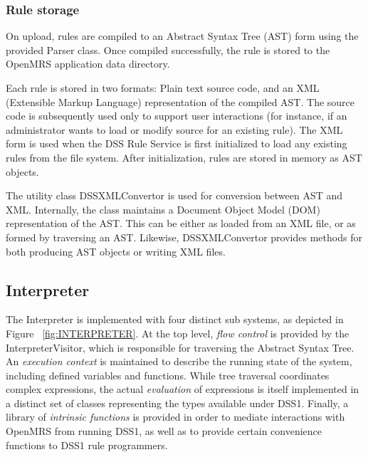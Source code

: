\documentclass[12pt,letterpaper]{article}
\begin{document}
{\subsubsection{Rule storage} \label{sec:RULE_STORAGE}

On upload, rules are compiled to an Abstract Syntax Tree (AST) form 
using the provided Parser class. Once compiled successfully, the rule is stored to the OpenMRS application data directory. 

Each rule is  stored in two formats: Plain text source code, and an XML (Extensible Markup Language) representation of the compiled AST. The 
source code is subsequently used only to support user interactions (for instance, if an administrator wants to load or modify source for an existing rule). The XML form is used when the DSS Rule Service is first initialized to load any existing rules from the file system. After initialization, rules are stored in memory as AST objects.

The utility class DSSXMLConvertor is used for conversion between AST and XML. Internally, the class maintains a Document Object Model (DOM) representation of the AST. This can be either as loaded from an XML file, or as formed by traversing an AST. Likewise, DSSXMLConvertor provides methods for both producing AST objects or writing XML files.

\subsection{Interpreter} \label{sec:INTERPRETER}

The Interpreter is implemented with four distinct sub systems, as depicted in Figure ~\ref{fig:INTERPRETER}.
At the top level, \emph{flow control} is provided by the InterpreterVisitor, which is responsible for traversing the Abstract Syntax Tree. An \emph{execution context} is maintained to describe the running state of the system, including defined variables and functions. While tree traversal coordinates complex expressions, the actual \emph{evaluation} of expressions is itself implemented in a distinct set of classes representing the types available under DSS1. Finally, a library of \emph{intrinsic functions} is provided in order to mediate interactions with OpenMRS from running DSS1, as well as to provide certain convenience functions to DSS1 rule programmers.

}
\end{document}
